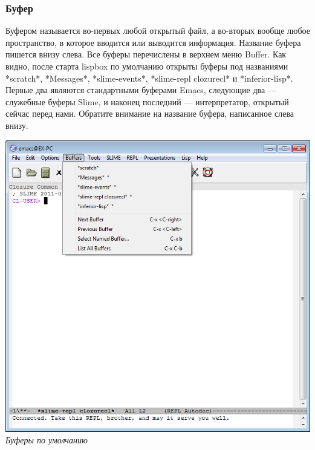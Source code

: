 \documentclass[a4paper, 10pt, titlepage, twoside]{article}
\begin{document}
\subsubsection{Буфер}
Буфером называется во-первых любой открытый файл, а во-вторых вообще любое пространство, в которое вводится или выводится информация. Название буфера пишется внизу слева. Все буферы перечислены в верхнем меню Buffer. Как видно, после старта lispbox по умолчанию открыты буферы под названиями *scratch*, *Messages*, *slime-events*, *slime-repl clozurecl* и *inferior-lisp*. Первые два являются стандартными буферами Emacs, следующие два --- служебные буферы Slime, и наконец последний --- интерпретатор, открытый сейчас перед нами. Обратите внимание на название буфера, написанное слева внизу.
\begin{center}
  \includegraphics[scale=.6]{lispbox_buffers}\\
  \small{\textit{Буферы по умолчанию}}
\end{center}
\end{document}
